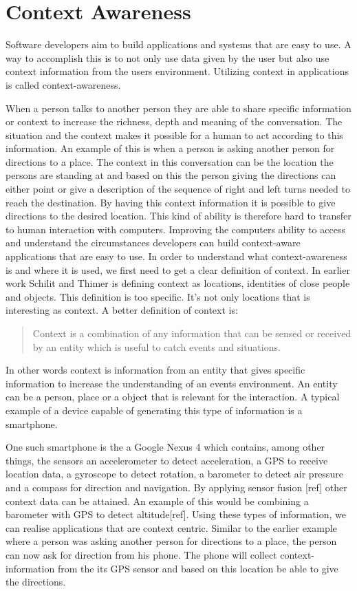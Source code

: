 \section{Context Awareness}
Software developers aim to build applications and systems that are easy to use. A way to accomplish this is to not only use data given by the user but also use context information from the users environment. Utilizing context in applications is called context-awareness.

When a person talks to another person they are able to share specific information or context to increase the richness, depth and meaning of the conversation. The situation and the context makes it possible for a human to act according to this information. 
An example of this is when a person is asking another person for directions to a place. The context in this conversation can be the location the persons are standing at and based on this the person giving the directions can either point or give a description of the sequence of right and left turns needed to reach the destination. By having this context information it is possible to give directions to the desired location. This kind of ability is therefore hard to transfer to human interaction with computers. Improving the computers ability to access and understand the circumstances developers can build context-aware applications that are easy to use. In order to understand what context-awareness is and where it is used, we first need to get a clear definition of context.
In earlier work Schilit and Thimer \cite{schilit1994disseminating} is defining context as locations, identities of close people and objects. This definition is too specific. It's not only locations that is interesting as context. A better definition of context is:

\begin{quotation}
Context is a combination of any information that can be sensed or received by an entity which is useful to catch events and situations. \cite{dey2001understanding}
\end{quotation}

In other words context is information from an entity that gives specific information to increase the understanding of an events environment. An entity can be a person, place or a object that is relevant for the interaction. A typical example of a device capable of generating this type of information is a smartphone.

One such smartphone is the a Google Nexus 4 \cite{GoogleNexus} which contains, among other things, the sensors an accelerometer to detect acceleration, a GPS to receive location data, a gyroscope to detect rotation, a barometer to detect air pressure and a compass for direction and navigation. By applying sensor fusion [ref] other context data can be attained. An example of this would be combining a barometer with GPS to detect altitude[ref]. Using these types of information, we can realise applications that are context centric. Similar to the earlier example where a person was asking another person for directions to a place, the person can now ask for direction from his phone. The phone will collect context-information from the its GPS sensor and based on this location be able to give the directions.

